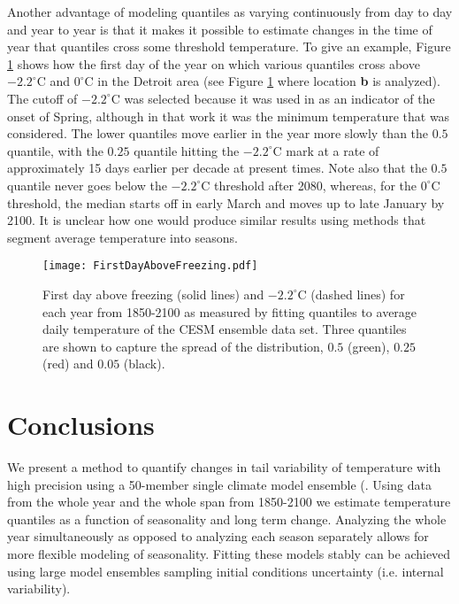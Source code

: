 \documentclass{ametsoc}
\newcommand\smallfigwidth{\columnwidth}
\begin{document}
{Another advantage of modeling quantiles as varying continuously from day to day and year to year is that it makes it possible to estimate changes in the time of year that quantiles cross some threshold temperature.  To give an example, Figure \ref{fig:FirstDayAboveFreezing} shows how the first day of the year on which various quantiles cross above $-2.2^{\circ}$C and $0^{\circ}$C in the Detroit area (see Figure \ref{fig:FirstDayAboveFreezing} where location \textbf{b} is analyzed).  The cutoff of $-2.2^{\circ}$C was selected because it was used in \cite{pearse2017statistical} as an indicator of the onset of Spring, although in that work it was the minimum temperature that was considered.
The lower quantiles move earlier in the year more slowly than the $0.5$ quantile, with the $0.25$ quantile hitting the $-2.2^{\circ}$C mark at a rate of approximately 15 days earlier per decade at present times. Note also that the $0.5$ quantile never goes below the  $-2.2^{\circ}$C threshold after 2080, whereas, for the $0^\circ$C threshold, the median starts off in early March and moves up to late January by 2100. It is unclear how one would produce similar results using methods that segment average temperature into seasons. }
\begin{figure}[ht]
\centerline{\texttt{[image: FirstDayAboveFreezing.pdf]}}
\caption{\small{First day above freezing (solid lines) and $-2.2^\circ$C (dashed lines) for each year from 1850-2100 as measured by fitting quantiles to average daily temperature of the CESM ensemble data set. Three quantiles are shown to capture the spread of the distribution, $0.5$ (green), $0.25$ (red) and $0.05$ (black).}}
\label{fig:FirstDayAboveFreezing}
\end{figure}


\section{Conclusions}
\label{sec:conclusions}

We present a method to quantify changes in tail variability of temperature with high precision using a 50-member single climate model ensemble (\citep{sriver2015effects, hogan2017analyzing, vega2017analysis}. Using data from the whole year and the whole span from 1850-2100 we estimate temperature quantiles as a function of seasonality and long term change. Analyzing the whole year simultaneously as opposed to analyzing each season separately allows for more flexible modeling of seasonality. Fitting these models stably can be achieved using large model ensembles sampling initial conditions uncertainty (i.e. internal variability).
\end{document}
